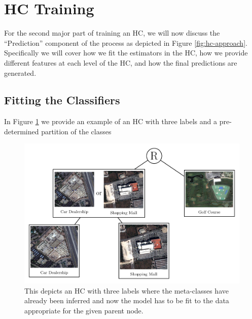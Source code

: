 \documentclass[../thesis.tex]{subfiles}
\begin{document}
\section{HC Training}
\label{hc-training}
For the second major part of training an HC, we will now discuss the
``Prediction'' component of the process as depicted in Figure
\ref{fig:hc-approach}. Specifically we will cover how we fit the estimators in
the HC, how we provide different features at each level of the HC, and how the
final predictions are generated.

\subsection{Fitting the Classifiers}
In Figure \ref{fig:example-hc} we provide an example of an HC with three labels
and a pre-determined partition of the classes
\begin{figure}
    \centering
    \includegraphics[width=\linewidth]{images/example-hc.pdf}
    \caption[Example Hierarchical Classifier]{This depicts an HC with three
    labels where the meta-classes have already been inferred and now the model
    has to be fit to the data appropriate for the given parent node.}
    \label{fig:example-hc}
\end{figure}
\end{document}
